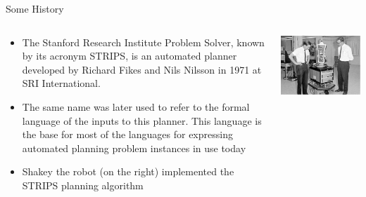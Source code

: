 \documentclass[t]{sdqbeamer}
\begin{document}
\begin{frame}{Some History}
\begin{columns}
\begin{column}{0.5\textwidth}
\begin{itemize}
\item The Stanford Research Institute Problem Solver, known by its acronym STRIPS, is an automated planner developed by Richard Fikes and Nils Nilsson in 1971 at SRI International.

\item The same name was later used to refer to the formal language of the inputs to this planner. This language is the base for most of the languages for expressing automated planning problem instances in use today

\item Shakey the robot (on the right) implemented the STRIPS planning algorithm
\end{itemize}
\end{column}
\begin{column}{0.5\textwidth}  %
    \begin{center}
\includegraphics[scale=3.65]{figures/l10/shakey.png}
     \end{center}
\end{column}

\end{columns}
\end{frame}
\end{document}
